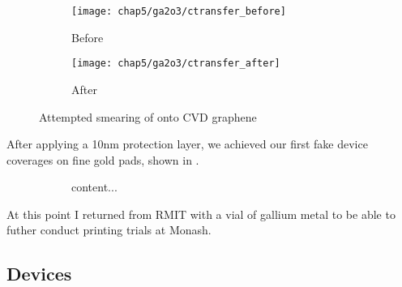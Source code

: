 \documentclass[../Matt_Gebert_Honours_Thesis.tex]{subfiles}
\begin{document}
	\begin{figure}[H]
		\begin{subfigure}{0.5\textwidth}
			\texttt{[image: chap5/ga2o3/ctransfer\_before]}
			\caption{Before}
		\end{subfigure}
		\begin{subfigure}{0.5\textwidth}
			\texttt{[image: chap5/ga2o3/ctransfer\_after]}
			\caption{After}
		\end{subfigure}
		\caption{Attempted smearing of \galliumoxide{} onto CVD graphene}\label{fig:ga_cvd}
	\end{figure}

	After applying a 10nm protection layer, we achieved our first fake device coverages on fine gold pads, shown in .
	\begin{figure}[H]
		\begin{subfigure}{}
			content...
		\end{subfigure}
		\caption[Smearing of \galliumoxide{} with 10nm \silicondioxide{} protection layer]{}\label{fig:smear2}
	\end{figure}
	
	At this point I returned from RMIT with a vial of gallium metal to be able to futher conduct printing trials at Monash.
	
	\begin{figure}[H]
		\caption[Smearing of \galliumoxide{} with 20nm \silicondioxide{} protection layer]{}
	\end{figure}
	
	\subsection{Devices}
	
	
	
\end{document}

